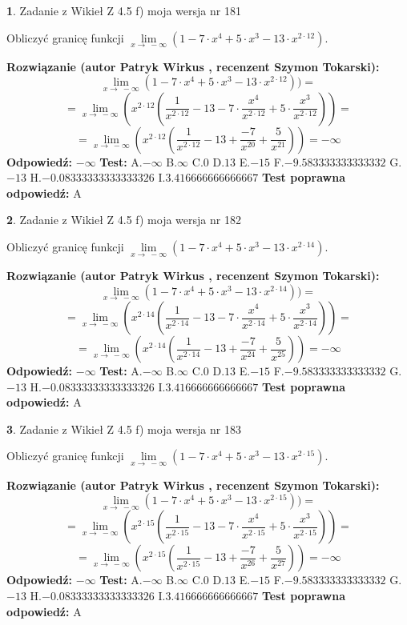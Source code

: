 \documentclass[12pt, a4paper]{article}
\theoremstyle{definition} %
\newtheorem{zad}{}
\newcommand{\zadStart}[1]{\begin{zad}#1\newline}
\newcommand{\zadStop}{\end{zad}}
\newcommand{\rozwStart}[2]{\noindent \textbf{Rozwiązanie (autor #1 , recenzent #2): }\newline}
\newcommand{\rozwStop}{\newline}
\newcommand{\odpStart}{\noindent \textbf{Odpowiedź:}\newline}
\newcommand{\odpStop}{\newline}
\newcommand{\testStart}{\noindent \textbf{Test:}\newline}
\newcommand{\testStop}{\newline}
\newcommand{\kluczStart}{\noindent \textbf{Test poprawna odpowiedź:}\newline}
\newcommand{\kluczStop}{\newline}
\begin{document}
\zadStart{Zadanie z Wikieł Z 4.5 f) moja wersja nr 181}


Obliczyć granicę funkcji  $\lim\limits_{x\to\ -\infty}(1 - 7 \cdot x^{4}+5 \cdot x^{3}- 13 \cdot x^{2\cdot12})$.
\zadStop
\rozwStart{Patryk Wirkus}{Szymon Tokarski}
$$\lim\limits_{x\to\ -\infty}(1 - 7 \cdot x^{4}+5 \cdot x^{3}- 13 \cdot x^{2\cdot12}))=$$
$$=\lim\limits_{x\to\ -\infty}(x^{2\cdot12}(\frac{1}{x^{2\cdot12}}-13 -7 \cdot \frac{x^{4}}{x^{2\cdot12}}+5 \cdot \frac{x^{3}}{x^{2\cdot12}}))=$$
$$=\lim\limits_{x\to\ -\infty}(x^{2\cdot12}(\frac{1}{x^{2\cdot12}}-13 + \frac{-7}{x^{20}}+ \frac{5}{x^{21}}))=-\infty$$
\rozwStop
\odpStart
$-\infty$
\odpStop
\testStart
A.$-\infty$ B.$\infty$ C.$0$ D.$13$ E.$-15$
F.$-9.583333333333332$ G.$-13$
H.$-0.08333333333333326$
I.$3.416666666666667$
\testStop
\kluczStart
A
\kluczStop



\zadStart{Zadanie z Wikieł Z 4.5 f) moja wersja nr 182}


Obliczyć granicę funkcji  $\lim\limits_{x\to\ -\infty}(1 - 7 \cdot x^{4}+5 \cdot x^{3}- 13 \cdot x^{2\cdot14})$.
\zadStop
\rozwStart{Patryk Wirkus}{Szymon Tokarski}
$$\lim\limits_{x\to\ -\infty}(1 - 7 \cdot x^{4}+5 \cdot x^{3}- 13 \cdot x^{2\cdot14}))=$$
$$=\lim\limits_{x\to\ -\infty}(x^{2\cdot14}(\frac{1}{x^{2\cdot14}}-13 -7 \cdot \frac{x^{4}}{x^{2\cdot14}}+5 \cdot \frac{x^{3}}{x^{2\cdot14}}))=$$
$$=\lim\limits_{x\to\ -\infty}(x^{2\cdot14}(\frac{1}{x^{2\cdot14}}-13 + \frac{-7}{x^{24}}+ \frac{5}{x^{25}}))=-\infty$$
\rozwStop
\odpStart
$-\infty$
\odpStop
\testStart
A.$-\infty$ B.$\infty$ C.$0$ D.$13$ E.$-15$
F.$-9.583333333333332$ G.$-13$
H.$-0.08333333333333326$
I.$3.416666666666667$
\testStop
\kluczStart
A
\kluczStop



\zadStart{Zadanie z Wikieł Z 4.5 f) moja wersja nr 183}


Obliczyć granicę funkcji  $\lim\limits_{x\to\ -\infty}(1 - 7 \cdot x^{4}+5 \cdot x^{3}- 13 \cdot x^{2\cdot15})$.
\zadStop
\rozwStart{Patryk Wirkus}{Szymon Tokarski}
$$\lim\limits_{x\to\ -\infty}(1 - 7 \cdot x^{4}+5 \cdot x^{3}- 13 \cdot x^{2\cdot15}))=$$
$$=\lim\limits_{x\to\ -\infty}(x^{2\cdot15}(\frac{1}{x^{2\cdot15}}-13 -7 \cdot \frac{x^{4}}{x^{2\cdot15}}+5 \cdot \frac{x^{3}}{x^{2\cdot15}}))=$$
$$=\lim\limits_{x\to\ -\infty}(x^{2\cdot15}(\frac{1}{x^{2\cdot15}}-13 + \frac{-7}{x^{26}}+ \frac{5}{x^{27}}))=-\infty$$
\rozwStop
\odpStart
$-\infty$
\odpStop
\testStart
A.$-\infty$ B.$\infty$ C.$0$ D.$13$ E.$-15$
F.$-9.583333333333332$ G.$-13$
H.$-0.08333333333333326$
I.$3.416666666666667$
\testStop
\kluczStart
A
\kluczStop
\end{document}
